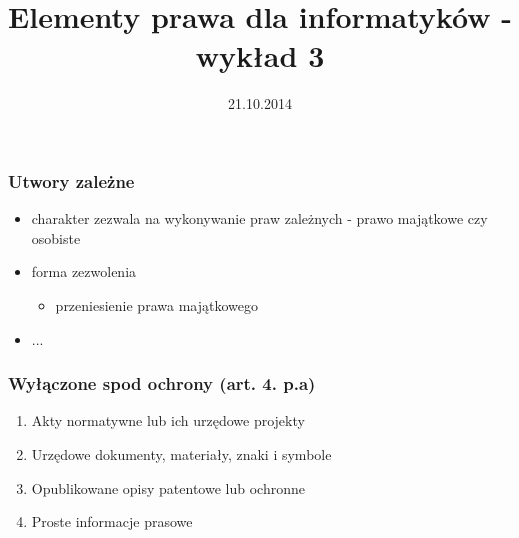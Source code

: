 \documentclass[12pt,a4paper]{article}
\title{Elementy prawa dla informatyków - wykład 3}
\author{}
\date{21.10.2014}
\begin{document}
\maketitle

\setcounter{section}{3}


\subsubsection{Utwory zależne}
\begin{itemize}
\item charakter zezwala na wykonywanie praw zależnych - prawo majątkowe czy osobiste
\item forma zezwolenia
	\begin{itemize}
	\item przeniesienie prawa majątkowego
	\end{itemize}
\item ...
\end{itemize}

\subsubsection{Wyłączone spod ochrony (art. 4. p.a)}
\begin{enumerate}
\item Akty normatywne lub ich urzędowe projekty
\item Urzędowe dokumenty, materiały, znaki i symbole
\item Opublikowane opisy patentowe lub ochronne
\item Proste informacje prasowe 
\end{enumerate}
\end{document}
